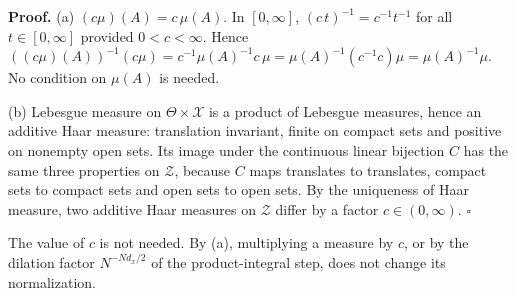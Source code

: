 \documentclass[11pt,a4paper]{report}
\begin{document}
\textbf{Proof.} (a) \((c\mu)(A)=c\,\mu(A)\). In \([0,\infty]\), \((c\,t)^{-1}=c^{-1}t^{-1}\) for all \(t\in[0,\infty]\) provided \(0<c<\infty\). Hence \(((c\mu)(A))^{-1}(c\mu)=c^{-1}\mu(A)^{-1}c\,\mu=\mu(A)^{-1}(c^{-1}c)\mu=\mu(A)^{-1}\mu\). No condition on \(\mu(A)\) is needed.




(b) Lebesgue measure on \(\Theta\times\mathcal X\) is a product of Lebesgue measures, hence an additive Haar measure: translation invariant, finite on compact sets and positive on nonempty open sets. Its image under the continuous linear bijection \(C\) has the same three properties on \(\mathcal Z\), because \(C\) maps translates to translates, compact sets to compact sets and open sets to open sets. By the uniqueness of Haar measure, two additive Haar measures on \(\mathcal Z\) differ by a factor \(c\in(0,\infty)\). \(\square\)




The value of \(c\) is not needed. By (a), multiplying a measure by \(c\), or by the dilation factor \(N^{-Nd_x/2}\) of the product-integral step, does not change its normalization.
\end{document}
